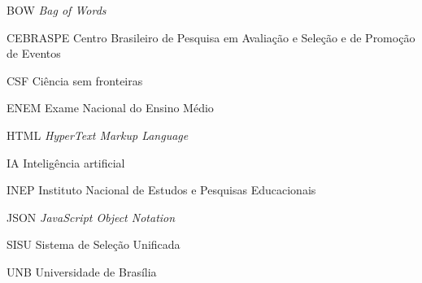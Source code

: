 \begin{basedescript}{\desclabelstyle{\pushlabel}\desclabelwidth{6em}}
\item[{BOW}] \textit{Bag of Words}%
\item[{CEBRASPE}] Centro Brasileiro de Pesquisa em Avaliação e Seleção e de Promoção de Eventos%
\item[{CSF}] Ciência sem fronteiras%
\item[{ENEM}] Exame Nacional do Ensino Médio%
\item[{HTML}] \textit{HyperText Markup Language}%
\item[{IA}] Inteligência artificial%
\item[{INEP}] Instituto Nacional de Estudos e Pesquisas Educacionais%
\item[{JSON}] \textit{JavaScript Object Notation}%
\item[{SISU}] Sistema de Seleção Unificada%
\item[{UNB}] Universidade de Brasília%
\end{basedescript}